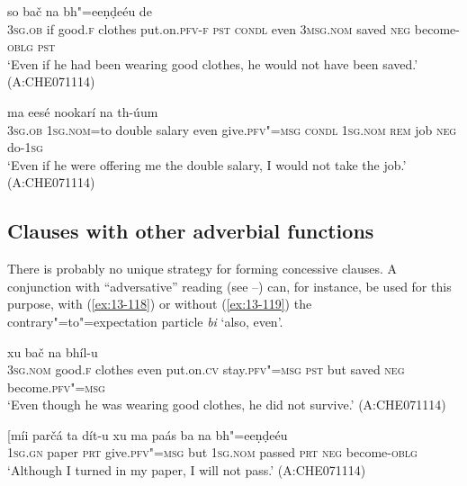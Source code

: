 \begin{exe}
\ex
\label{ex:13-116}
 so bač na bh"=eeṇḍeéu de  \\
\textsc{3sg.ob} if good.\textsc{f} clothes put.on.\textsc{pfv-f} \textsc{pst} \textsc{condl}  even \textsc{3msg.nom} saved \textsc{neg} become-\textsc{oblg} \textsc{pst} \\
\glt `Even if he had been wearing good clothes, he would not have been saved.' (A:CHE071114)

\ex
\label{ex:13-117}
\gll [tíi máa=the ḍábal tanxaá bi dít-u  heentá] ma eesé nookarí na th-úum \\
\textsc{3sg.ob} \textsc{1sg.nom}=to double salary even give.\textsc{pfv"=msg}  \textsc{condl } \textsc{1sg.nom} \textsc{rem} job \textsc{neg} do-\textsc{1sg} \\
\glt `Even if he were offering me the double salary, I would not take the job.' (A:CHE071114)
\end{exe}

\subsection{Clauses with other adverbial functions}
\label{subsec:13-4-5}

 There is probably no unique strategy for forming concessive clauses. A conjunction with ``adversative'' reading (see --) can, for instance, be used for this purpose, with (\ref{ex:13-118}) or without (\ref{ex:13-119}) the contrary"=to"=expectation particle \textit{bi} `also, even'. 

\begin{exe}
\ex
\label{ex:13-118}
 xu bač na bhíl-u  \\
\textsc{3sg.nom} good.\textsc{f} clothes even put.on.\textsc{cv}  stay.\textsc{pfv"=msg } \textsc{pst} but saved \textsc{neg} become.\textsc{pfv"=msg} \\
\glt `Even though he was wearing good clothes, he did not survive.' (A:CHE071114)

\ex
\label{ex:13-119}
\gll [míi parčá ta dít-u xu ma paás  ba na bh"=eeṇḍeéu \\
\textsc{1sg.gn} paper \textsc{prt} give.\textsc{pfv"=msg} but \textsc{1sg.nom} passed \textsc{prt} \textsc{neg} become-\textsc{oblg} \\
\glt `Although I turned in my paper, I will not pass.' (A:CHE071114) 
\end{exe}

